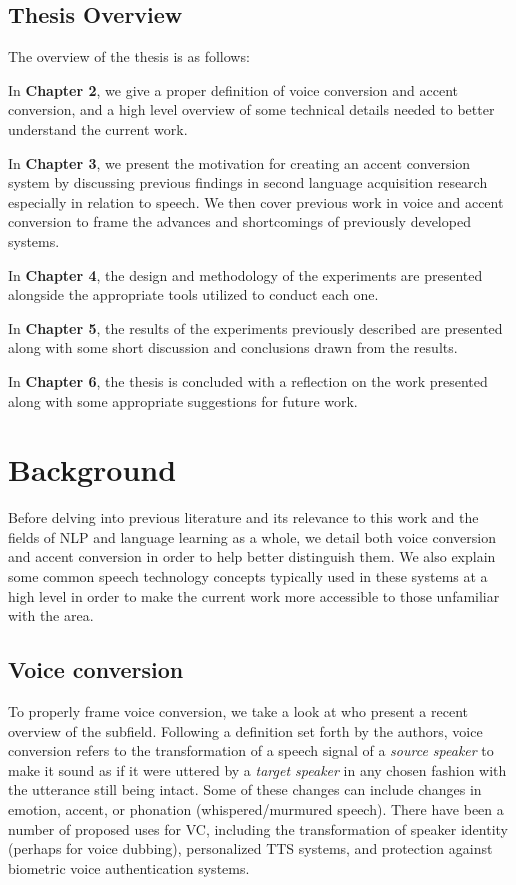 \documentclass
[
    a4paper,
    twoside,
    12pt,
]
{report}
\begin{document}
\hypertarget{thesis-overview}{%
\section{Thesis Overview}\label{thesis-overview}}

The overview of the thesis is as follows:

In \textbf{Chapter 2}, we give a proper definition of voice conversion
and accent conversion, and a high level overview of some technical
details needed to better understand the current work.

In \textbf{Chapter 3}, we present the motivation for creating an accent
conversion system by discussing previous findings in second language
acquisition research especially in relation to speech. We then cover
previous work in voice and accent conversion to frame the advances and
shortcomings of previously developed systems.

In \textbf{Chapter 4}, the design and methodology of the experiments are
presented alongside the appropriate tools utilized to conduct each one.

In \textbf{Chapter 5}, the results of the experiments previously
described are presented along with some short discussion and conclusions
drawn from the results.

In \textbf{Chapter 6}, the thesis is concluded with a reflection on the
work presented along with some appropriate suggestions for future work.
\cleardoublepage

\chapter{Background}

Before delving into previous literature and its relevance to this work
and the fields of NLP and language learning as a whole, we detail both
voice conversion and accent conversion in order to help better
distinguish them. We also explain some common speech technology concepts
typically used in these systems at a high level in order to make the
current work more accessible to those unfamiliar with the area.

\hypertarget{voice-conversion}{%
\section{Voice conversion}\label{voice-conversion}}

To properly frame voice conversion, we take a look at
\textcite{mohammadi2017} who present a recent overview of the subfield.
Following a definition set forth by the authors, voice conversion refers
to the transformation of a speech signal of a \emph{source speaker} to
make it sound as if it were uttered by a \emph{target speaker} in any
chosen fashion with the utterance still being intact. Some of these
changes can include changes in emotion, accent, or phonation
(whispered/murmured speech). There have been a number of proposed uses
for VC, including the transformation of speaker identity (perhaps for
voice dubbing), personalized TTS systems, and protection against
biometric voice authentication systems.
\end{document}
